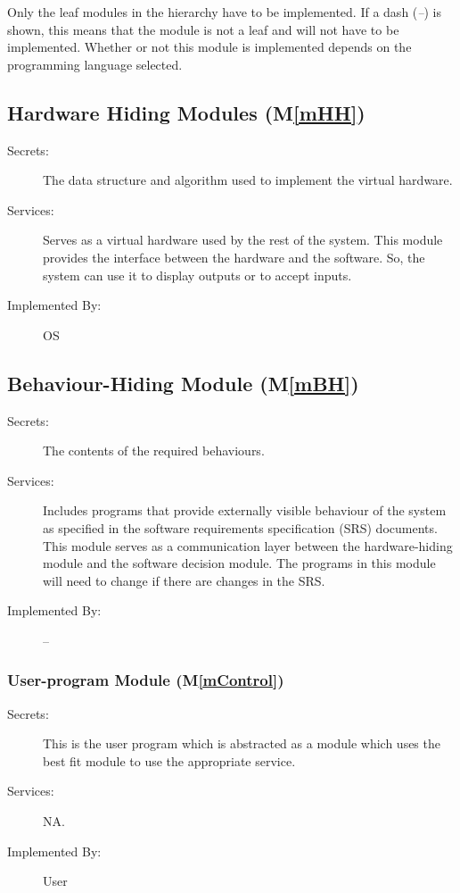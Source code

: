 \documentclass[12pt, titlepage]{article}
\newcommand{\mref}[1]{M\ref{#1}}
\begin{document}
Only the leaf modules in the hierarchy have to be implemented. If a dash (\emph{--}) is shown, this means that the module is not a leaf and will not have to be implemented. Whether or not this module is implemented depends on the programming language selected.

\subsection{Hardware Hiding Modules (\mref{mHH})}

\begin{description}
\item[Secrets:]The data structure and algorithm used to implement the virtual
  hardware.
\item[Services:]Serves as a virtual hardware used by the rest of the
  system. This module provides the interface between the hardware and the
  software. So, the system can use it to display outputs or to accept inputs.
\item[Implemented By:] OS
\end{description}

\subsection{Behaviour-Hiding Module (\mref{mBH})}

\begin{description}
\item[Secrets:]The contents of the required behaviours.
\item[Services:]Includes programs that provide externally visible behaviour of
  the system as specified in the software requirements specification (SRS)
  documents. This module serves as a communication layer between the
  hardware-hiding module and the software decision module. The programs in this
  module will need to change if there are changes in the SRS.
\item[Implemented By:] --
\end{description}
\subsubsection{User-program Module (\mref{mControl})}

\begin{description}
	\item[Secrets:]This is the user program which is abstracted as a module which uses the best fit module to use the appropriate service. 
	\item[Services:] NA.
	\item[Implemented By:] User
\end{description}
\end{document}
